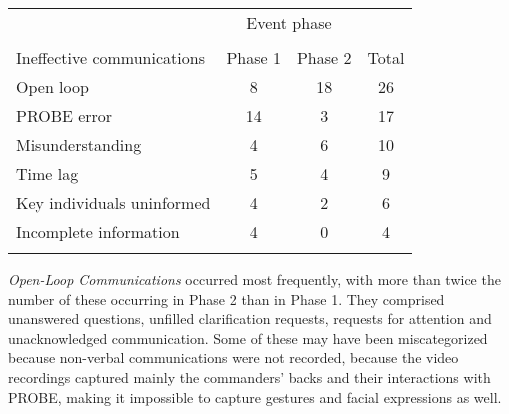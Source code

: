 \documentclass[link]{IWCOMP}
\begin{document}
\def\z{\phantom{0}}
\begin{table}[!b]
{\begin{tabular*}{21pc}{@{}lccc@{}}
\toprule
&\multicolumn{2}{c}{Event phase} & \\\cline{2-3}\\[-11.5pt]
Ineffective communications &\multicolumn{1}{c}{Phase 1} &\multicolumn{1}{c}{Phase 2} &\multicolumn{1}{c}{Total} \\\midrule
Open loop & \z8 &18 &26 \\
PROBE error &14 &\z3 &17 \\
Misunderstanding &\z4 &\z6 &10 \\
Time lag &\z5 &\z4 &\z9 \\
Key individuals uninformed &\z4 &\z2 &\z6 \\
Incomplete information &\z4 &\z0 &\z4 \\
\botrule
\end{tabular*}}{}
\end{table}

\textit{Open-Loop Communications} occurred most frequently, with more than twice the number of these occurring
in Phase 2 than in Phase 1. They comprised unanswered questions, unfilled
clarification requests, requests for attention and unacknowledged
communication. Some of these may have been miscategorized because non-verbal
communications were not recorded, because the video recordings captured
mainly the commanders' backs and their interactions with PROBE, making it
impossible to capture gestures and facial expressions as well.
\end{document}
